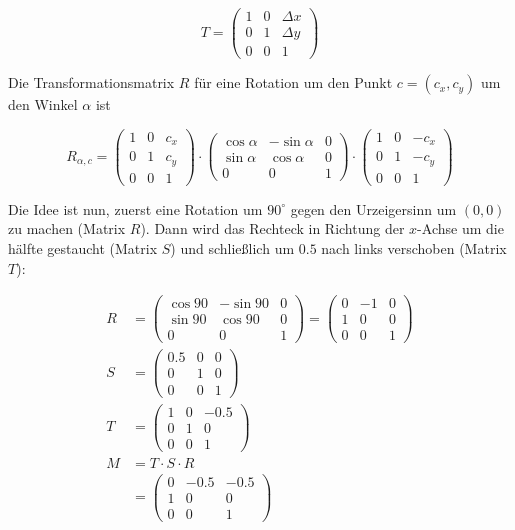 \documentclass[a4paper]{scrartcl}
\begin{document}
\[T = \begin{pmatrix}1 & 0 & \Delta x\\0 & 1 & \Delta y\\0 & 0 & 1\end{pmatrix}\]

Die Transformationsmatrix $R$ für eine Rotation um den Punkt $c = (c_x, c_y)$ um den Winkel $\alpha$ ist

\[R_{\alpha, c} = \begin{pmatrix}          1 &            0 & c_x\\          0 &           1 & c_y\\0 & 0 & 1\end{pmatrix} \cdot
  \begin{pmatrix}\cos \alpha & -\sin \alpha &   0\\\sin \alpha & \cos \alpha &   0\\0 & 0 & 1\end{pmatrix} \cdot
  \begin{pmatrix}          1 &            0 &-c_x\\          0 &           1 &-c_y\\0 & 0 & 1\end{pmatrix}\]

Die Idee ist nun, zuerst eine Rotation um $90^\circ$ gegen den Urzeigersinn
um $(0, 0)$ zu machen (Matrix $R$). Dann wird das Rechteck in Richtung der $x$-Achse um
die hälfte gestaucht (Matrix $S$) und schließlich um $0.5$ nach links verschoben (Matrix $T$):

\begin{align}
    R &= \begin{pmatrix}\cos 90 & -\sin 90 &   0\\\sin 90 & \cos 90 &   0\\0 & 0 & 1\end{pmatrix}
       = \begin{pmatrix}0 & -1 &   0\\1 & 0 &   0\\0 & 0 & 1\end{pmatrix}\\
    S &= \begin{pmatrix}0.5 & 0 & 0\\0 & 1 & 0\\0 & 0 & 1\end{pmatrix}\\
    T &= \begin{pmatrix}1 & 0 & -0.5\\0 & 1 & 0\\0 & 0 & 1\end{pmatrix}\\
    M &= T \cdot S \cdot R\\
      &= \begin{pmatrix}0 & -0.5 & -0.5\\1 & 0 & 0\\0 & 0 & 1\end{pmatrix}
\end{align}
\end{document}
